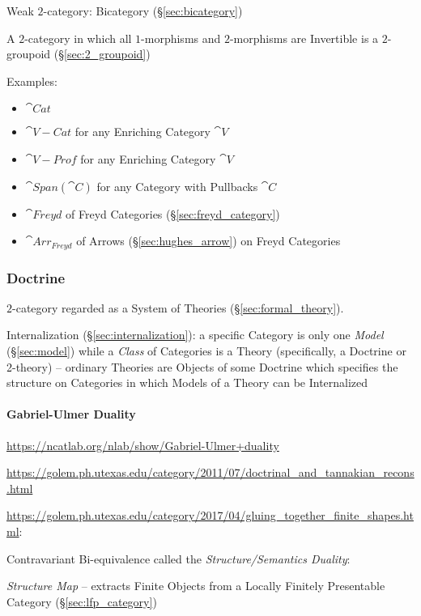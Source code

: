Weak $2$-category: Bicategory (\S\ref{sec:bicategory})

A $2$-category in which all $1$-morphisms and $2$-morphisms are
Invertible is a $2$-groupoid (\S\ref{sec:2_groupoid})

Examples:
\begin{itemize}
\item $\cat{Cat}$
\item $\cat{V-Cat}$ for any Enriching Category $\cat{V}$
\item $\cat{V-Prof}$ for any Enriching Category $\cat{V}$
\item $\cat{Span}(\cat{C})$ for any Category with Pullbacks $\cat{C}$
\item $\cat{Freyd}$ of Freyd Categories (\S\ref{sec:freyd_category})
\item $\cat{Arr_{Freyd}}$ of Arrows (\S\ref{sec:hughes_arrow}) on
  Freyd Categories
\end{itemize}



\subsubsection{Doctrine}\label{sec:doctrine}

$2$-category regarded as a System of Theories
(\S\ref{sec:formal_theory}).

Internalization (\S\ref{sec:internalization}): a specific Category is
only one \emph{Model} (\S\ref{sec:model}) while a \emph{Class} of
Categories is a Theory (specifically, a Doctrine or 2-theory) --
ordinary Theories are Objects of some Doctrine which specifies the
structure on Categories in which Models of a Theory can be Internalized



\paragraph{Gabriel-Ulmer Duality}\label{sec:gabriel_ulmer_duality}
\hfill

\url{https://ncatlab.org/nlab/show/Gabriel-Ulmer+duality}

\url{https://golem.ph.utexas.edu/category/2011/07/doctrinal_and_tannakian_recons.html}

\url{https://golem.ph.utexas.edu/category/2017/04/gluing_together_finite_shapes.html}:

Contravariant Bi-equivalence called the \emph{Structure/Semantics
  Duality}:

\emph{Structure Map} -- extracts Finite Objects from a Locally
Finitely Presentable Category (\S\ref{sec:lfp_category})

